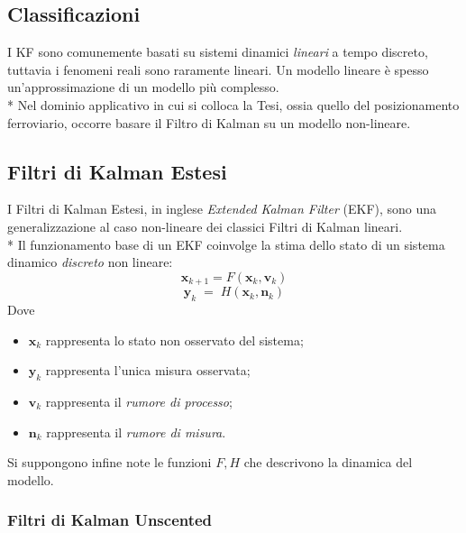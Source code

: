 \subsection{Classificazioni}
I KF sono comunemente basati su sistemi dinamici \emph{lineari} a tempo discreto, tuttavia i fenomeni reali sono raramente lineari. Un modello lineare \`e spesso un'approssimazione di un modello pi\`u complesso.\\*
Nel dominio applicativo in cui si colloca la Tesi, ossia quello del posizionamento ferroviario, occorre basare il Filtro di Kalman su un modello non-lineare.
\subsection{Filtri di Kalman Estesi}
I Filtri di Kalman Estesi, in inglese \emph{Extended Kalman Filter} (EKF), sono una generalizzazione al caso non-lineare dei classici Filtri di Kalman lineari.\\*
Il funzionamento base di un EKF coinvolge la stima dello stato di un sistema dinamico \emph{discreto} non lineare:
$$
\mathbf{x}_{k+1} = F(\mathbf{x}_k,\mathbf{v}_k)
$$
$$
\mathbf{y}_k\;=\;H(\mathbf{x}_k,\mathbf{n}_k)
$$
Dove
\begin{itemize}
	\item $\mathbf{x}_k$ rappresenta lo stato non osservato del sistema;
	\item $\mathbf{y}_k$ rappresenta l'unica misura osservata;
	\item $\mathbf{v}_k$ rappresenta il \emph{rumore di processo};
	\item $\mathbf{n}_k$ rappresenta il \emph{rumore di misura}.
\end{itemize}
Si suppongono infine note le funzioni $F,H$ che descrivono la dinamica del modello.
\subsubsection{Filtri di Kalman Unscented}